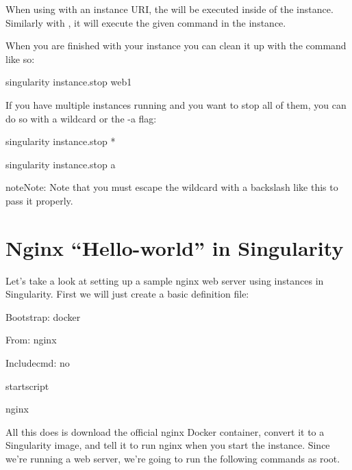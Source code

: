 \documentclass[letterpaper,10pt,english]{sphinxmanual}
\begin{document}
When using  with an instance URI, the  will be executed inside of the
instance. Similarly with , it will execute the given command in the
instance.

When you are finished with your instance you can clean it up with the
 command like so:

%
\begin{sphinxVerbatim}[commandchars=\\\{\}]
\PYGZdl{} singularity instance.stop web1
\end{sphinxVerbatim}

If you have multiple instances running and you want to stop all of
them, you can do so with a wildcard or the -a flag:

%
\begin{sphinxVerbatim}[commandchars=\\\{\}]
\PYGZdl{} singularity instance.stop \PYGZbs{}*

\PYGZdl{} singularity instance.stop \PYGZhy{}a
\end{sphinxVerbatim}

\begin{sphinxadmonition}{note}{Note:}
Note that you must escape the wildcard with a backslash like this \sphinxcode{\sphinxupquote{\textbackslash{}*}} to
pass it properly.
\end{sphinxadmonition}


\section{Nginx “Hello-world” in Singularity}
\label{\detokenize{running_services:nginx-hello-world-in-singularity}}
Let’s take a look at setting up a sample nginx web server using
instances in Singularity. First we will just create a basic definition
file:

%
\begin{sphinxVerbatim}[commandchars=\\\{\}]
Bootstrap: docker

From: nginx

Includecmd: no


\PYGZpc{}startscript

    nginx
\end{sphinxVerbatim}

All this does is download the official nginx Docker container, convert
it to a Singularity image, and tell it to run nginx when you start the
instance. Since we’re running a web server, we’re going to run the
following commands as root.
\end{document}
